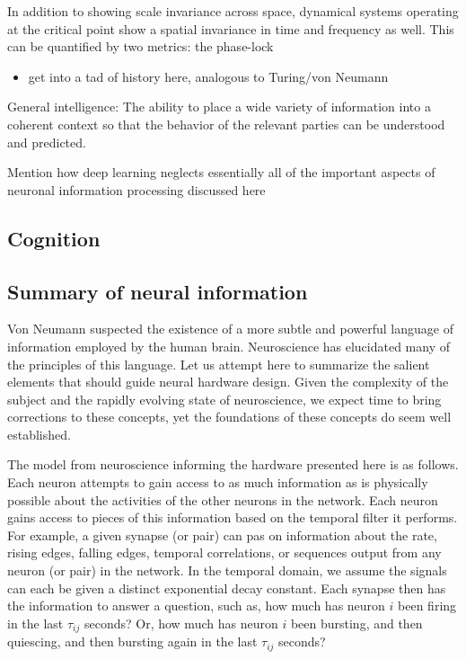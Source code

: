 \documentclass[twocolumn]{article}
\begin{document}
In addition to showing scale invariance across space, dynamical systems operating at the critical point show a spatial invariance in time and frequency as well. This can be quantified by two metrics: the phase-lock

\begin{itemize}
\item get into a tad of history here, analogous to Turing/von Neumann
\end{itemize}

General intelligence: The ability to place a wide variety of information into a coherent context so that the behavior of the relevant parties can be understood and predicted.

Mention how deep learning neglects essentially all of the important aspects of neuronal information processing discussed here




\subsection{Cognition}

\subsection{Summary of neural information}
Von Neumann suspected the existence of a more subtle and powerful language of information employed by the human brain. Neuroscience has elucidated many of the principles of this language. Let us attempt here to summarize the salient elements that should guide neural hardware design. Given the complexity of the subject and the rapidly evolving state of neuroscience, we expect time to bring corrections to these concepts, yet the foundations of these concepts do seem well established.

The model from neuroscience informing the hardware presented here is as follows. Each neuron attempts to gain access to as much information as is physically possible about the activities of the other neurons in the network. Each neuron gains access to pieces of this information based on the temporal filter it performs. For example, a given synapse (or pair) can pas on information about the rate, rising edges, falling edges, temporal correlations, or sequences output from any neuron (or pair) in the network. In the temporal domain, we assume the signals can each be given a distinct exponential decay constant. Each synapse then has the information to answer a question, such as, how much has neuron $i$ been firing in the last $\tau_{ij}$ seconds? Or, how much has neuron $i$ been bursting, and then quiescing, and then bursting again in the last $\tau_{ij}$ seconds? 
\end{document}
